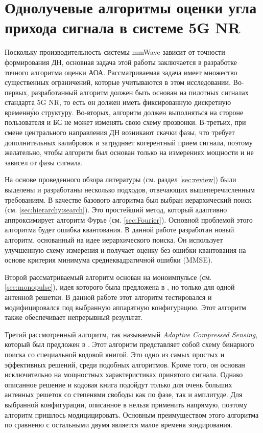 
\section{Однолучевые алгоритмы оценки угла прихода сигнала в системе 5G NR}
\label{sec:singlepath}
Поскольку производительность системы mmWave зависит от точности формирования ДН,
основная задача этой работы заключается в разработке точного алгоритма оценки
АОА. Рассматриваемая задача имеет множество существенных ограничений, которые
учитываются в этом исследовании.  Во-первых, разработанный алгоритм должен быть
основан на пилотных сигналах стандарта 5G NR, то есть он должен иметь
фиксированную дискретную временн\'{у}ю структуру.  Во-вторых,
алгоритм должен выполняться на стороне пользователя и БС не может изменять свою
схему прозвонки. В-третьих, при смене центрального направления ДН возникают
скачки фазы, что требует дополнительных калибровок и затрудняет когерентный
прием сигнала, поэтому желательно, чтобы алгоритм был основан только на
измерениях мощности и не зависел от фазы сигнала.

На основе проведенного обзора литературы (см. раздел \ref{sec:review})
были выделены и разработаны несколько подходов, отвечающих вышеперечисленным
требованиям. В качестве базового алгоритма был выбран
иерархический поиск (см.  \ref{sec:hierarchy:search}).  Это простейший метод,
который адаптивно аппроксимирует алгоритм Фурье (см. \ref{sec:Fourier}).
Основной проблемой этого алгоритма будет ошибка квантования.  В данной работе
разработан новый алгоритм, основанный на идее иерархического поиска.  Он
использует улучшенную схему измерения и получает оценку без ошибки квантования
на основе критерия минимума среднеквадратичной ошибки (MMSE).

Второй рассматриваемый алгоритм основан на моноимпульсе (см.
\ref{sec:monopulse}), идея которого была предложена в \cite{Zhu2016, Kim2019},
но только для одной антенной решетки. В данной работе этот алгоритм тестировался
и модифицировался под выбранную аппаратную конфигурацию.  Этот алгоритм также
обеспечивает непрерывный результат.

Третий рассмотренный алгоритм, так называемый \textit{Adaptive Compressed
    Sensing}, который был предложен в \cite{Alkhateeb2014}.  Этот алгоритм
представляет собой схему бинарного поиска со специальной кодовой книгой. Это
одно из самых простых и эффективных решений, среди подобных алгоритмов.  Кроме
того, он основан исключительно на мощностных характеристиках принятого сигнала.
Однако описанное решение и кодовая книга подойдут только для очень больших
антенных решеток со степенями свободы как по фазе, так и амплитуде. Для
выбранной конфигурации, описанное в \cite{Alkhateeb2014} нельзя применить
напрямую, поэтому алгоритм пришлось модицицировать.  Основным преимуществом
этого алгоритма по сравненю с остальными двумя является малое временя зондирования.

